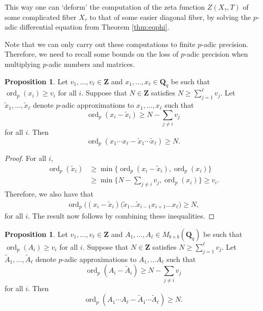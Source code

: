 \documentclass[a4paper,11pt]{article}
\numberwithin{equation}{section}
\newcommand{\ZZ}{\mathbf{Z}} %
\newcommand{\QQ}{\mathbf{Q}} %
\DeclareMathOperator{\ord}{ord}          %
\theoremstyle{definition}
\newtheorem{prop}[thm]{Proposition}
\begin{document}
This way one can `deform' the computation of the zeta function $Z(X_{\tau},T)$ of some complicated fiber $X_{\tau}$
to that of some easier diagonal fiber, by solving the $p$-adic differential equation from Theorem \ref{thm:eqphi}.

Note that we can only carry out these computations to finite $p$-adic precision. Therefore, we need to recall 
some bounds on the loss of $p$-adic precision when multiplying $p$-adic numbers and matrices. 

\begin{prop} \label{prop:productval}
Let $v_1,\ldots,v_{\ell} \in \ZZ$ and $x_1, \dotsc, x_{\ell} \in \mathbf{Q}_q$  
be such that $\ord_p(x_i) \geq v_i$ for all $i$. Suppose that $N \in \ZZ$ satisfies 
$N \geq \sum_{j=1}^{\ell} v_j$. Let $\tilde{x}_1, \dotsc, \tilde{x}_{\ell}$ denote 
$p$-adic approximations to $x_1, \dotsc, x_{\ell}$ such that 
\[
\ord_p(x_i - \tilde{x}_i) \geq N - \sum_{j \neq i} v_j
\] 
for all $i$.  Then 
\begin{equation*}
\ord_p(x_1 \dotsm x_{\ell} - \tilde{x}_1 \dotsm \tilde{x}_{\ell}) \geq N.
\end{equation*}
\end{prop}

\begin{proof}
For all $i$,
\begin{align*}
\ord_p(\tilde{x}_i) &\geq \min \{ \ord_p(x_i-\tilde{x}_i), \ord_p(x_i) \} \\
                    &\geq \min \{ N- \sum_{j \neq i} v_j, \ord_p(x_i)\} \geq v_i.
\end{align*}
Therefore, we also have that
\begin{align*}
\ord_p \bigl( (x_{i}-\tilde{x}_{i})(\tilde{x}_1 \dotsc \tilde{x}_{i-1} x_{i+1} \dotsc x_{\ell} \bigr) \geq N,
\end{align*}
for all $i$. The result now follows by combining these inequalities.
\end{proof}

\begin{prop} \label{prop:matrixproductval}
Let $v_1,\ldots,v_{\ell} \in \ZZ$ and $A_1, \dotsc, A_{\ell} \in M_{b \times b}(\QQ_q)$
be such that $\ord_p(A_i) \geq v_i$ for all $i$. Suppose that $N \in \ZZ$ satisfies 
$N \geq \sum_{j=1}^{\ell} v_j$.
Let $\tilde{A}_1, \dotsc, \tilde{A}_{\ell}$ denote $p$-adic approximations 
to $A_1, \dotsc A_{\ell}$ such that
\[
\ord_p(A_i - \tilde{A}_i) \geq N - \sum_{j \neq i} v_j
\]
for all $i$.  Then 
\begin{equation}
\ord_p(A_1 \dotsm A_{\ell} - \tilde{A}_1 \dotsm \tilde{A}_{\ell}) \geq N.
\end{equation}
\end{prop}
\end{document}
